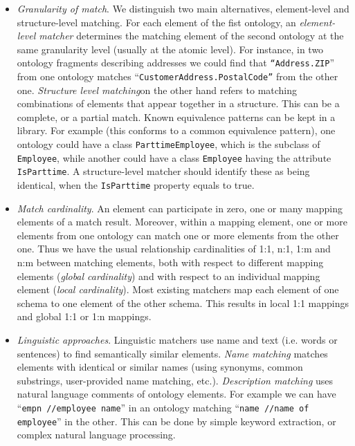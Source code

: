 \documentclass{fast_latex}
\begin{document}
\begin{itemize}
\item \textit{Granularity of match}. We distinguish two main
alternatives, element-level and structure-level matching. For each
element of the fist ontology, an \textit{element-level matcher}
determines the matching element of the second ontology at the same
granularity level (usually at the atomic level). For instance, in two
ontology fragments describing addresses we could find that
\texttt{{\textquotedblleft}Address.ZIP}{\textquotedblright}
from one ontology matches
{\textquotedblleft}\texttt{CustomerAddress.PostalCode{\textquotedblright}}
from the other one. \textit{Structure level matching}on the other hand
refers to matching combinations of elements that appear together in a
structure. This can be a complete, or a partial match. Known
equivalence patterns can be kept in a library. For example (this
conforms to a common equivalence pattern), one ontology could have a
class \texttt{ParttimeEmployee}, which is the subclass of
\texttt{Employee}, while another could have a class
\texttt{Employee} having the attribute
\texttt{IsParttime}. A structure-level matcher should
identify these as being identical, when the
\texttt{IsParttime} property equals to true. 
\end{itemize}
\begin{itemize}
\item \textit{Match cardinality}. An element can participate in zero,
one or many mapping elements of a match result. Moreover, within a
mapping element, one or more elements from one ontology can match one
or more elements from the other one. Thus we have the usual
relationship cardinalities of 1:1, n:1, 1:m and n:m between matching
elements, both with respect to different mapping elements
(\textit{global cardinality}) and with respect to an individual mapping
element (\textit{local cardinality}).\newline
Most existing matchers map each element of one schema to one element of
the other schema. This results in local 1:1 mappings and global 1:1 or
1:n mappings. 
\end{itemize}
\begin{itemize}
\item \textit{Linguistic approaches}. Linguistic matchers use name and
text (i.e. words or sentences) to find semantically similar elements.
\textit{Name matching} matches elements with identical or similar names
(using synonyms, common substrings, user-provided name matching, etc.).
\textit{Description matching} uses natural language comments of
ontology elements. For example we can have
{\textquotedblleft}\texttt{empn //employee
name}{\textquotedblright} in an ontology matching
{\textquotedblleft}\texttt{name //name of
employee}{\textquotedblright} in the other. This can be done by simple
keyword extraction, or complex natural language processing. 
\end{itemize}
\end{document}
